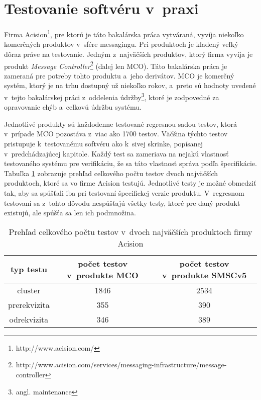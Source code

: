 \section{Testovanie softvéru v~praxi} 
\label{sekcia:testovanie_v_praxi}
Firma Acision\footnote{http://www.acision.com/}, pre ktorú je táto 
bakalárska práca vytváraná, vyvíja niekoľko komerčných produktov
v~sfére messagingu. 
Pri produktoch je kladený veľký dôraz práve na testovanie.
Jedným z~najväčších produktov, ktorý firma vyvíja je produkt 
\textit{Message Controller}\footnote{http://www.acision.com/services/messaging-infrastructure/message-controller}
(ďalej len MCO).
Táto bakalárska práca je zameraná pre potreby tohto produktu a~jeho 
derivátov. MCO je komerčný systém, ktorý je na trhu dostupný už niekoľko 
rokov, a~preto sú hodnoty uvedené v~tejto bakalárskej práci z~oddelenia 
údržby\footnote{angl. maintenance}, ktoré je zodpovedné za opravovanie 
chýb a~celkovú údržbu systému.

Jednotlivé produkty sú každodenne testované regresnou 
sadou testov, ktorá v~prípade MCO pozostáva z~viac ako 1700 testov.
Väčšina týchto testov pristupuje k~testovanému softvéru ako k~sivej 
skrinke, popísanej v~predchádzajúcej kapitole.
Každý test sa zameriava na nejakú vlastnosť testovaného systému pre 
verifikáciu, že sa táto vlastnosť správa podľa špecifikácie.
Tabuľka \ref{tabulka:pocet_testov} zobrazuje prehľad celkového počtu 
testov dvoch najväčších produktoch, ktoré sa vo firme Acision testujú.
Jednotlivé testy je možné obmedziť tak, aby sa spúšťali iba pri testovaní
špecifickej verzie produktu. 
V~regresnom testovaní sa z~tohto dôvodu nespúšťajú všetky testy, 
ktoré pre daný produkt existujú, ale spúšťa sa len ich podmnožina.

\begin{table}
  \begin{center}
    \begin{tabular}{| c | c | c |}
    \hline
    typ testu & počet testov v~produkte MCO & počet testov v~produkte SMSCv5 \\ \hline
    cluster & 1846 & 2534 \\ \hline
    prerekvizita & 355 & 390 \\ \hline
    odrekvizita & 346 & 389 \\
    \hline
    \end{tabular}
    \caption{Prehľad celkového počtu testov v~dvoch najväčších 
             produktoch firmy Acision}
    \label{tabulka:pocet_testov}
  \end{center}
\end{table}

